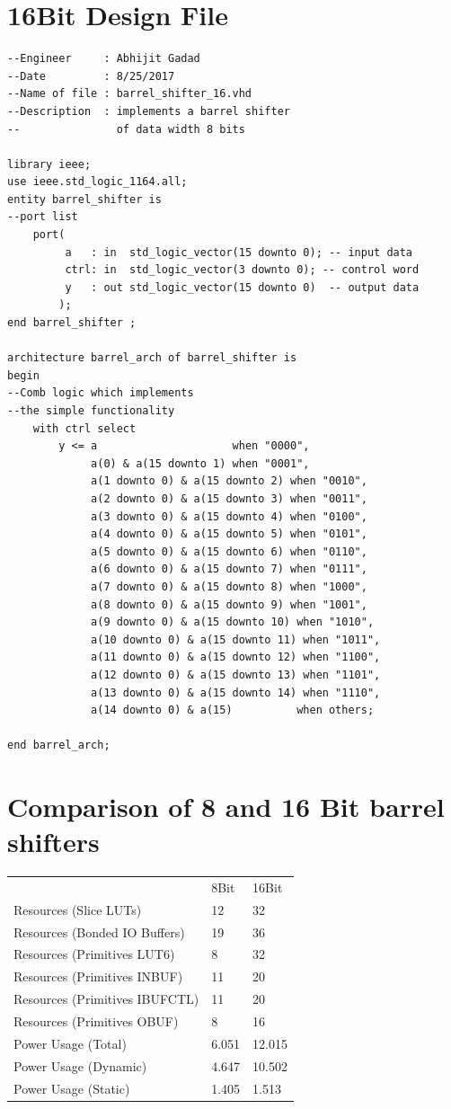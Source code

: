\documentclass[11pt]{report}
\begin{document}
\section*{16Bit Design File}
\begin{lstlisting}
--Engineer     : Abhijit Gadad
--Date         : 8/25/2017
--Name of file : barrel_shifter_16.vhd
--Description  : implements a barrel shifter
--               of data width 8 bits

library ieee;
use ieee.std_logic_1164.all;
entity barrel_shifter is
--port list
    port(
         a   : in  std_logic_vector(15 downto 0); -- input data
         ctrl: in  std_logic_vector(3 downto 0); -- control word
         y   : out std_logic_vector(15 downto 0)  -- output data
        );
end barrel_shifter ;

architecture barrel_arch of barrel_shifter is
begin
--Comb logic which implements 
--the simple functionality
    with ctrl select
        y <= a                     when "0000",
             a(0) & a(15 downto 1) when "0001",
             a(1 downto 0) & a(15 downto 2) when "0010",
             a(2 downto 0) & a(15 downto 3) when "0011",
             a(3 downto 0) & a(15 downto 4) when "0100",
             a(4 downto 0) & a(15 downto 5) when "0101",
             a(5 downto 0) & a(15 downto 6) when "0110",
             a(6 downto 0) & a(15 downto 7) when "0111",
             a(7 downto 0) & a(15 downto 8) when "1000",
             a(8 downto 0) & a(15 downto 9) when "1001",
             a(9 downto 0) & a(15 downto 10) when "1010",
             a(10 downto 0) & a(15 downto 11) when "1011",
             a(11 downto 0) & a(15 downto 12) when "1100",
             a(12 downto 0) & a(15 downto 13) when "1101",
             a(13 downto 0) & a(15 downto 14) when "1110",
             a(14 downto 0) & a(15)          when others;

end barrel_arch; 
\end{lstlisting}
		
		
\section*{Comparison of 8 and 16 Bit barrel shifters}

\begin{tabular}{lll}
	 & 8Bit & 16Bit\\
	Resources (Slice LUTs) & 12 & 32\\
	Resources (Bonded IO Buffers) & 19 & 36\\
	Resources (Primitives LUT6) & 8 & 32\\
	Resources (Primitives INBUF) & 11 & 20\\
	Resources (Primitives IBUFCTL) & 11 & 20\\
	Resources (Primitives OBUF) & 8 & 16\\
	Power Usage (Total) & 6.051 & 12.015 \\
	Power Usage (Dynamic) & 4.647 & 10.502 \\
	Power Usage (Static) & 1.405 & 1.513 \\
\end{tabular}
\end{document}
